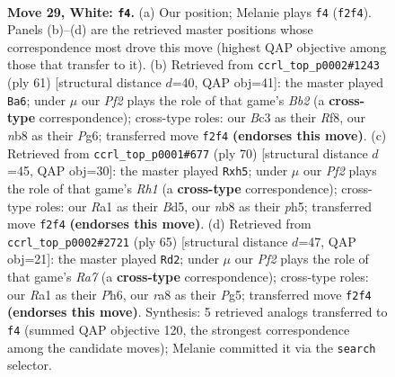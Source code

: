 \documentclass[11pt]{article}
\begin{document}
\clearpage

\begin{figure}[p]\centering
\begin{subfigure}{0.46\textwidth}\centering
\resizebox{\linewidth}{!}{%
\newchessgame
\chessboard[
  setfen={rn4k1/8/p7/3R1pr1/1P6/2B5/P3bP1K/R7 w - - 2 29},
  showmover=false,
  pgfstyle=straightmove, color=movearrow, markmove={f2-f4}
]}
\caption{}
\end{subfigure}\hfill
\begin{subfigure}{0.46\textwidth}\centering
\resizebox{\linewidth}{!}{%
\newchessgame
\chessboard[
  setfen={5rk1/1b6/6pp/p2pr3/3N4/1PR1P1P1/7P/3RK3 b - - 3 31},
  showmover=false,
  pgfstyle=straightmove, color=movearrow, markmove={b7-a6}
]}
\caption{}
\end{subfigure}
\\[4pt]
\begin{subfigure}{0.46\textwidth}\centering
\resizebox{\linewidth}{!}{%
\newchessgame
\chessboard[
  setfen={1r5k/4r2p/8/3B3p/1p1b1P2/6P1/6K1/1R5R w - - 2 36},
  showmover=false,
  pgfstyle=straightmove, color=movearrow, markmove={h1-h5}
]}
\caption{}
\end{subfigure}\hfill
\begin{subfigure}{0.46\textwidth}\centering
\resizebox{\linewidth}{!}{%
\newchessgame
\chessboard[
  setfen={6k1/5r2/7p/6p1/8/8/r3nPPP/1R1N1R1K b - - 4 33},
  showmover=false,
  pgfstyle=straightmove, color=movearrow, markmove={a2-d2}
]}
\caption{}
\end{subfigure}
\caption{\textbf{Move 29, White: \texttt{f4}.} (a) Our position; Melanie plays \texttt{f4} (\texttt{f2f4}). Panels (b)--(d) are the retrieved master positions whose correspondence most drove this move (highest QAP objective among those that transfer to it). (b) Retrieved from \texttt{ccrl\_top\_p0002\#1243} (ply 61) [structural distance $d$=40, QAP obj=41]: the master played \texttt{Ba6}; under $\mu$ our \emph{Pf2} plays the role of that game's \emph{Bb2} (a \textbf{cross-type} correspondence); cross-type roles: our \emph{B}c3 as their \emph{R}f8, our \emph{n}b8 as their \emph{P}g6; transferred move \texttt{f2f4} \textbf{(endorses this move)}. (c) Retrieved from \texttt{ccrl\_top\_p0001\#677} (ply 70) [structural distance $d$=45, QAP obj=30]: the master played \texttt{Rxh5}; under $\mu$ our \emph{Pf2} plays the role of that game's \emph{Rh1} (a \textbf{cross-type} correspondence); cross-type roles: our \emph{R}a1 as their \emph{B}d5, our \emph{n}b8 as their \emph{p}h5; transferred move \texttt{f2f4} \textbf{(endorses this move)}. (d) Retrieved from \texttt{ccrl\_top\_p0002\#2721} (ply 65) [structural distance $d$=47, QAP obj=21]: the master played \texttt{Rd2}; under $\mu$ our \emph{Pf2} plays the role of that game's \emph{Ra7} (a \textbf{cross-type} correspondence); cross-type roles: our \emph{R}a1 as their \emph{P}h6, our \emph{r}a8 as their \emph{P}g5; transferred move \texttt{f2f4} \textbf{(endorses this move)}. Synthesis: 5 retrieved analogs transferred to \texttt{f4} (summed QAP objective 120, the strongest correspondence among the candidate moves); Melanie committed it via the \texttt{search} selector.}
\label{fig:thought-m56}
\end{figure}
\end{document}
